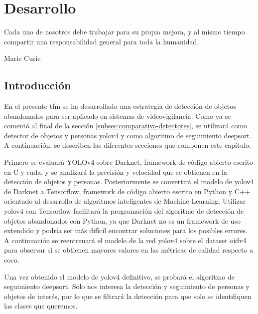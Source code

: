
\chapter{Desarrollo}
\label{cha:desarrollo}

\begin{FraseCelebre}
  \begin{Frase}
    Cada uno de nosotros debe trabajar para su propia mejora, y al mismo tiempo compartir una responsabilidad general para toda la humanidad.
  \end{Frase}
  \begin{Fuente}
    Marie Curie
  \end{Fuente}
\end{FraseCelebre}

\section{Introducción}
\label{sec:intro-desarrollo}

En el presente \gls{tfm} se ha desarrollado una estrategia de detección de objetos abandonados para ser aplicado en sistemas de videovigilancia. Como ya se comentó al final de la sección \ref{subsec:comparativa-detectores}, se utilizará como detector de objetos y personas \gls{yolov4} y como algoritmo de seguimiento \gls{deepsort}. A continuación, se describen las diferentes secciones que componen este capítulo.

Primero se evaluará YOLOv4 sobre Darknet, framework de código abierto escrito en C y \gls{cuda}, y se analizará la precisión y velocidad que se obtienen en la detección de objetos y personas. Posteriormente se convertirá el modelo de \gls{yolov4} de Darknet a Tensorflow, framework de código abierto escrito en Python y C++ orientado al desarrollo de algoritmos inteligentes de Machine Learning. Utilizar \gls{yolov4} con Tensorflow facilitará la programación del algoritmo de detección de objetos abandonados con Python, ya que Darknet no es un framework de uso extendido y podría ser más difícil encontrar soluciones para los posibles errores. A continuación se reentrenará el modelo de la red \gls{yolov4} sobre el dataset \gls{oidv4} para observar si se obtienen mayores valores en las métricas de calidad respecto a \gls{coco}.

Una vez obtenido el modelo de \gls{yolov4} definitivo, se probará el algoritmo de seguimiento \gls{deepsort}. Solo nos interesa la detección y seguimiento de personas y objetos de interés, por lo que se filtrará la detección para que solo se identifiquen las clases que queremos.


